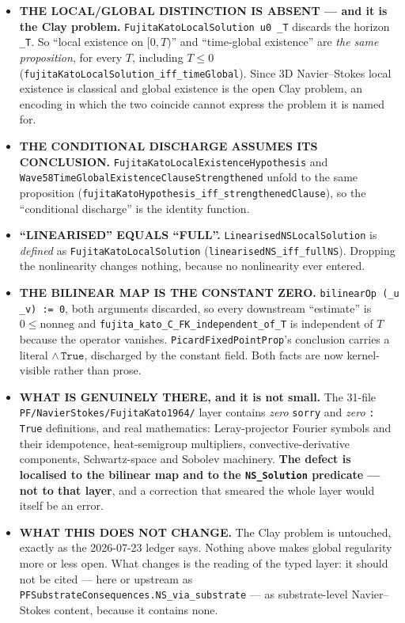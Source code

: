 \begin{itemize}
\item \textbf{THE LOCAL/GLOBAL DISTINCTION IS ABSENT --- and it is the Clay
problem.} \texttt{FujitaKatoLocalSolution u0 \_T} discards the horizon
\texttt{\_T}. So ``local existence on $[0,T)$'' and ``time-global existence''
are \emph{the same proposition}, for every $T$, including $T \le 0$
(\texttt{fujitaKatoLocalSolution\_iff\_timeGlobal}). Since 3D Navier--Stokes
local existence is classical and global existence is the open Clay problem, an
encoding in which the two coincide cannot express the problem it is named for.
\item \textbf{THE CONDITIONAL DISCHARGE ASSUMES ITS CONCLUSION.}
\texttt{FujitaKatoLocalExistenceHypothesis} and
\texttt{Wave58TimeGlobalExistenceClauseStrengthened} unfold to the same
proposition (\texttt{fujitaKatoHypothesis\_iff\_strengthenedClause}), so the
``conditional discharge'' is the identity function.
\item \textbf{``LINEARISED'' EQUALS ``FULL''.}
\texttt{LinearisedNSLocalSolution} is \emph{defined} as
\texttt{FujitaKatoLocalSolution} (\texttt{linearisedNS\_iff\_fullNS}). Dropping
the nonlinearity changes nothing, because no nonlinearity ever entered.
\item \textbf{THE BILINEAR MAP IS THE CONSTANT ZERO.}
\texttt{bilinearOp (\_u \_v) := 0}, both arguments discarded, so every downstream
``estimate'' is $0 \le \text{nonneg}$ and
\texttt{fujita\_kato\_C\_FK\_independent\_of\_T} is independent of $T$ because
the operator vanishes. \texttt{PicardFixedPointProp}'s conclusion carries a
literal $\wedge\,\texttt{True}$, discharged by the constant field. Both facts are
now kernel-visible rather than prose.
\item \textbf{WHAT IS GENUINELY THERE, and it is not small.} The 31-file
\texttt{PF/NavierStokes/FujitaKato1964/} layer contains \emph{zero}
\texttt{sorry} and \emph{zero} \texttt{: True} definitions, and real
mathematics: Leray-projector Fourier symbols and their idempotence,
heat-semigroup multipliers, convective-derivative components, Schwartz-space
and Sobolev machinery. \textbf{The defect is localised to the bilinear map and
to the \texttt{NS\_Solution} predicate --- not to that layer}, and a correction
that smeared the whole layer would itself be an error.
\item \textbf{WHAT THIS DOES NOT CHANGE.} The Clay problem is untouched, exactly
as the 2026-07-23 ledger says. Nothing above makes global regularity more or
less open. What changes is the reading of the typed layer: it should not be
cited --- here or upstream as
\texttt{PFSubstrateConsequences.NS\_via\_substrate} --- as substrate-level
Navier--Stokes content, because it contains none.
\end{itemize}

